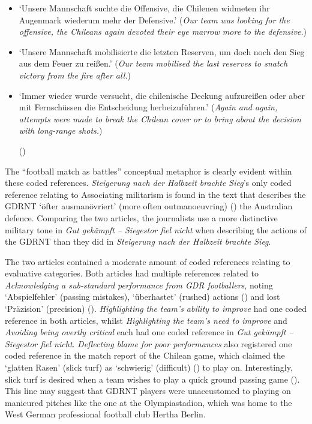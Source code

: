 \begin{itemize}
    \item ‘Unsere Mannschaft suchte die Offensive, die Chilenen widmeten ihr Augenmark wiederum mehr der Defensive.’\newline
    (\textit{Our team was looking for the offensive, the Chileans again devoted their eye marrow more to the defensive.})
    \item ‘Unsere Mannschaft mobilisierte die letzten Reserven, um doch noch den Sieg aus dem Feuer zu reißen.’
    (\textit{Our team mobilised the last reserves to snatch victory from the fire after all.})
    \item ‘Immer wieder wurde versucht, die chilenische Deckung aufzureißen oder aber mit Fernschüssen die Entscheidung herbeizuführen.’
    (\textit{Again and again, attempts were made to break the Chilean cover or to bring about the decision with long-range shots.})\newline
    \begin{flushright}\footnotesize (\cite{nd19740619})\end{flushright}
\end{itemize}

The “football match as battles” conceptual metaphor is clearly evident within these coded references. \textit{Steigerung nach der Halbzeit brachte Sieg}’s only coded reference relating to Associating militarism is found in the text that describes the GDRNT ‘öfter ausmanövriert’ (more often outmanoeuvring) (\cite{nd19740615}) the Australian defence. Comparing the two articles, the journalists use a more distinctive military tone in \textit{Gut gekämpft – Siegestor fiel nicht} when describing the actions of the GDRNT than they did in \textit{Steigerung nach der Halbzeit brachte Sieg}.

The two articles contained a moderate amount of coded references relating to evaluative categories. Both articles had multiple references related to \textit{Acknowledging a sub-standard performance from GDR footballers}, noting ‘Abspielfehler’ (passing mistakes), ‘überhastet’ (rushed) actions (\cite{nd19740615}) and lost ‘Präzision’ (precision) (\cite{nd19740619}). \textit{Highlighting the team’s ability to improve} had one coded reference in both articles, whilst \textit{Highlighting the team’s need to improve} and \textit{Avoiding being overtly critical} each had one coded reference in \textit{Gut gekämpft – Siegestor fiel nicht}. \textit{Deflecting blame for poor performances} also registered one coded reference in the match report of the Chilean game, which claimed the ‘glatten Rasen’ (slick turf) as ‘schwierig’ (difficult) (\cite{nd19740619}) to play on. Interestingly, slick turf is desired when a team wishes to play a quick ground passing game (\cite{barnetthilditch1993}). This line may suggest that GDRNT players were unaccustomed to playing on manicured pitches like the one at the Olympiastadion, which was home to the West German professional football club Hertha Berlin.

